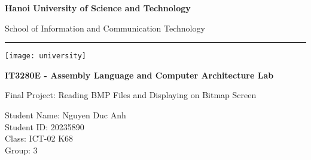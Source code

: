 \documentclass{article}
\begin{document}
\begin{titlepage}
    \begin{center}
        \vspace*{1cm}
            
        \LARGE
        \textbf{Hanoi University of Science and Technology}
            
        \vspace{0.1cm}
        \Large
        School of Information and Communication Technology
        \rule{\linewidth}{0.4pt}
    
        \vspace{4cm}
            
        \texttt{[image: university]}
        
        \vspace{3cm}

        \Large
        \textbf{IT3280E - Assembly Language and Computer Architecture Lab}

        \vspace{0.25cm}
        \Large
        Final Project: Reading BMP Files and Displaying on Bitmap Screen
        \vspace{0.5cm}
        \large

        Student Name: Nguyen Duc Anh\\
        Student ID: 20235890\\
        Class: ICT-02 K68\\
        Group: 3\\
            
    \end{center}
\end{titlepage}
\end{document}
